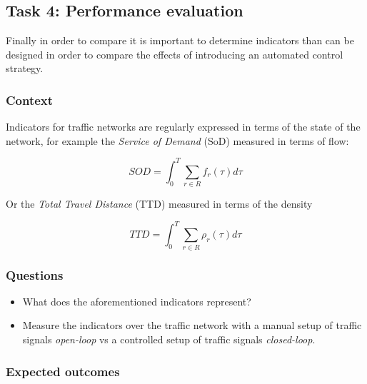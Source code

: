 \documentclass[]{book}
\theoremstyle{definition}
\theoremstyle{definition}
\theoremstyle{definition}
\theoremstyle{remark}
\begin{document}
\hypertarget{task-4-performance-evaluation}{%
\subsection*{Task 4: Performance
evaluation}\label{task-4-performance-evaluation}}

Finally in order to compare it is important to determine indicators than
can be designed in order to compare the effects of introducing an
automated control strategy.

\hypertarget{context-4}{%
\subsubsection*{Context}\label{context-4}}

Indicators for traffic networks are regularly expressed in terms of the
state of the network, for example the \emph{Service of Demand} (SoD)
measured in terms of flow:

\begin{equation}
SOD = \int_0^T \sum_{r \in R} f_r(\tau) d\tau \label{eq:sod}
\end{equation}

Or the \emph{Total Travel Distance} (TTD) measured in terms of the
density

\begin{equation}
TTD = \int_0^T \sum_{r \in R} \rho_r(\tau) d\tau \label{eq:ttd}
\end{equation}

\hypertarget{questions-3}{%
\subsubsection*{Questions}\label{questions-3}}

\begin{itemize}
\item
  What does the aforementioned indicators represent?
\item
  Measure the indicators over the traffic network with a manual setup of
  traffic signals \emph{open-loop} vs a controlled setup of traffic
  signals \emph{closed-loop}.
\end{itemize}

\hypertarget{expected-outcomes-3}{%
\subsubsection*{Expected outcomes}\label{expected-outcomes-3}}
\end{document}
